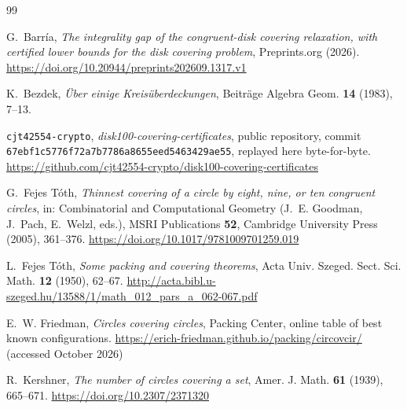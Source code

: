 %
%

\begin{thebibliography}{99}
\small

G.~Barr\'ia,
\emph{The integrality gap of the congruent-disk covering relaxation, with certified lower bounds for the disk covering problem},
Preprints.org (2026).
\url{https://doi.org/10.20944/preprints202609.1317.v1}

K.~Bezdek,
\emph{\"Uber einige Kreis\"uberdeckungen},
Beitr\"age Algebra Geom. \textbf{14} (1983), 7--13.

\texttt{cjt42554-crypto},
\emph{disk100-covering-certificates}, public repository, commit
\texttt{67ebf1c5776f72a7b7786a8655eed5463429ae55}, replayed here byte-for-byte.
\url{https://github.com/cjt42554-crypto/disk100-covering-certificates}

G.~Fejes T\'oth,
\emph{Thinnest covering of a circle by eight, nine, or ten congruent circles},
in: Combinatorial and Computational Geometry (J.~E. Goodman, J.~Pach, E.~Welzl, eds.),
MSRI Publications \textbf{52}, Cambridge University Press (2005), 361--376.
\url{https://doi.org/10.1017/9781009701259.019}

L.~Fejes T\'oth,
\emph{Some packing and covering theorems},
Acta Univ. Szeged. Sect. Sci. Math. \textbf{12} (1950), 62--67.
\url{http://acta.bibl.u-szeged.hu/13588/1/math_012_pars_a_062-067.pdf}

E.~W. Friedman,
\emph{Circles covering circles}, Packing Center, online table of best known configurations.
\url{https://erich-friedman.github.io/packing/circovcir/}
(accessed October 2026)

R.~Kershner,
\emph{The number of circles covering a set},
Amer. J. Math. \textbf{61} (1939), 665--671.
\url{https://doi.org/10.2307/2371320}


\end{thebibliography}
